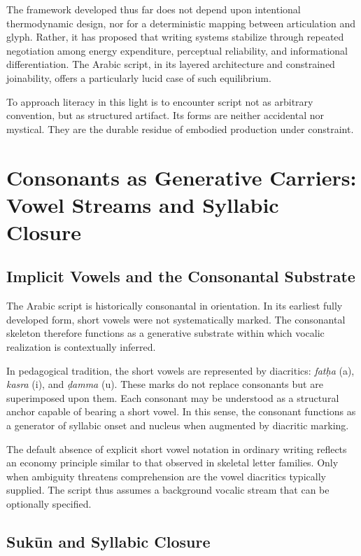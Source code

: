 \documentclass[11pt]{article}
\begin{document}
The framework developed thus far does not depend upon intentional thermodynamic design, nor for a deterministic mapping between articulation and glyph. Rather, it has proposed that writing systems stabilize through repeated negotiation among energy expenditure, perceptual reliability, and informational differentiation. The Arabic script, in its layered architecture and constrained joinability, offers a particularly lucid case of such equilibrium.

To approach literacy in this light is to encounter script not as arbitrary convention, but as structured artifact. Its forms are neither accidental nor mystical. They are the durable residue of embodied production under constraint.

\section{Consonants as Generative Carriers: Vowel Streams and Syllabic Closure}

\subsection{Implicit Vowels and the Consonantal Substrate}

The Arabic script is historically consonantal in orientation. In its earliest fully developed form, short vowels were not systematically marked. The consonantal skeleton therefore functions as a generative substrate within which vocalic realization is contextually inferred.

In pedagogical tradition, the short vowels are represented by diacritics: \textit{fatḥa} (a), \textit{kasra} (i), and \textit{ḍamma} (u). These marks do not replace consonants but are superimposed upon them. Each consonant may be understood as a structural anchor capable of bearing a short vowel. In this sense, the consonant functions as a generator of syllabic onset and nucleus when augmented by diacritic marking.

The default absence of explicit short vowel notation in ordinary writing reflects an economy principle similar to that observed in skeletal letter families. Only when ambiguity threatens comprehension are the vowel diacritics typically supplied. The script thus assumes a background vocalic stream that can be optionally specified.

\subsection{Sukūn and Syllabic Closure}
\end{document}
